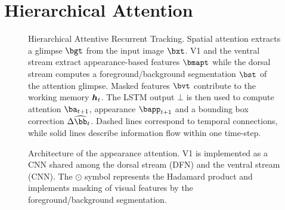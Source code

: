 \section{Hierarchical Attention}
\label{sec:att}


	\begin{figure}[ht]
		\centering
	 	\usebox{\systemfig}
	 	\caption{Hierarchical Attentive Recurrent Tracking. Spatial attention extracts a glimpse $\bgt$ from the input image $\bxt$. V1 and the ventral stream extract appearance-based features $\bmapt$ while the dorsal stream computes a foreground/background segmentation $\bst$ of the attention glimpse. Masked features $\bvt$ contribute to the working memory $\B{h}_t$. The LSTM output $\bot$ is then used to compute attention $\ba_{t+1}$, appearance $\bapp_{t+1}$ and a bounding box correction $\Delta \widehat{\bb}_t$. Dashed lines correspond to temporal connections, while solid lines describe information flow within one time-step.}
		\label{fig:system}
	\end{figure}
	
    \begin{figure}
      \begin{minipage}[c]{0.3\textwidth}
        \usebox{\archfig}
      \end{minipage}\hfill
      \begin{minipage}[c]{0.6\textwidth}
        \caption{Architecture of the appearance attention. V1 is implemented as a CNN shared among the dorsal stream (DFN) and the ventral stream (CNN). The $\odot$ symbol represents the Hadamard product and implements masking of visual features by the foreground/background segmentation.}
    	\label{fig:arch}
      \end{minipage}
    \end{figure}

